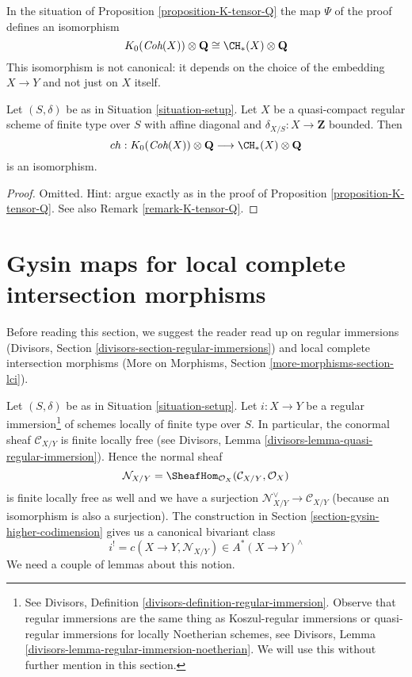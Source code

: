 \begin{remark}
\label{remark-K-tensor-Q}
In the situation of Proposition \ref{proposition-K-tensor-Q}
the map $\Psi$ of the proof defines an isomorphism
$$
K_0(\textit{Coh}(X)) \otimes \mathbf{Q} \cong \CH_*(X) \otimes \mathbf{Q}
$$
This isomorphism is not canonical: it depends on the choice of the
embedding $X \to Y$ and not just on $X$ itself.
\end{remark}

\begin{lemma}
\label{lemma-K-tensor-Q}
Let $(S, \delta)$ be as in Situation \ref{situation-setup}.
Let $X$ be a quasi-compact regular scheme of finite type over $S$ with
affine diagonal and $\delta_{X/S} : X \to \mathbf{Z}$ bounded.
Then
$$
ch :
K_0(\textit{Coh}(X)) \otimes \mathbf{Q}
\longrightarrow
\CH_*(X) \otimes \mathbf{Q}
$$
is an isomorphism.
\end{lemma}

\begin{proof}
Omitted. Hint: argue exactly as in the proof of
Proposition \ref{proposition-K-tensor-Q}. See also
Remark \ref{remark-K-tensor-Q}.
\end{proof}








\section{Gysin maps for local complete intersection morphisms}
\label{section-koszul}

\noindent
Before reading this section, we suggest the reader read up on
regular immersions
(Divisors, Section \ref{divisors-section-regular-immersions}) and
local complete intersection morphisms
(More on Morphisms, Section \ref{more-morphisms-section-lci}).

\medskip\noindent
Let $(S, \delta)$ be as in Situation \ref{situation-setup}.
Let $i : X \to Y$ be a
regular immersion\footnote{See
Divisors, Definition \ref{divisors-definition-regular-immersion}.
Observe that regular immersions are the same thing as
Koszul-regular immersions or quasi-regular immersions
for locally Noetherian schemes, see
Divisors, Lemma \ref{divisors-lemma-regular-immersion-noetherian}.
We will use this without further mention in this section.}
of schemes locally of finite type over $S$.
In particular, the conormal sheaf $\mathcal{C}_{X/Y}$ is finite locally free
(see Divisors, Lemma \ref{divisors-lemma-quasi-regular-immersion}). Hence the
normal sheaf
$$
\mathcal{N}_{X/Y} = \SheafHom_{\mathcal{O}_X}(\mathcal{C}_{X/Y}, \mathcal{O}_X)
$$
is finite locally free as well and we have a surjection
$\mathcal{N}_{X/Y}^\vee \to \mathcal{C}_{X/Y}$ (because an isomorphism
is also a surjection).
The construction in Section \ref{section-gysin-higher-codimension}
gives us a canonical bivariant class
$$
i^! = c(X \to Y, \mathcal{N}_{X/Y}) \in A^*(X \to Y)^\wedge
$$
We need a couple of lemmas about this notion.

